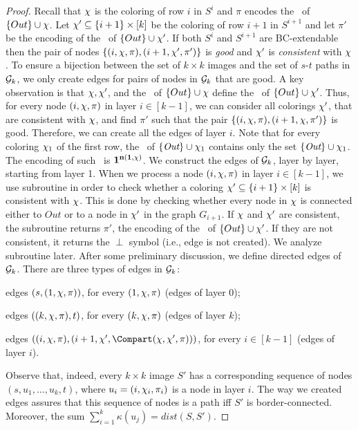 \documentclass[11pt,english]{article}
\renewenvironment{itemize}[1]{\begin{compactitem}#1}{\end{compactitem}}
\numberwithin{figure}{section}
\newcommand{\dis}{dist}
\begin{document}
\begin{proof}
Recall that $\chi$ is the coloring of row $i$ in $S^i$ and $\pi$ encodes the \cc\ of $\{Out\}\cup\chi$. Let $\chi'\subseteq\{i+1\}\times[k]$ be the coloring of row $i+1$ in $S^{i+1}$ and let $\pi'$ be the encoding of the \cc\ of $\{Out\}\cup\chi'$. If both $S^i$ and $S^{i+1}$ are BC-extendable then the pair of nodes $\{(i,\chi,\pi),(i+1,\chi',\pi')\}$ is {\em good} and $\chi'$ is {\em consistent} with $\chi$. To ensure a bijection between the set of $k\times k$ images and the set of $s$-$t$ paths in ${\mathcal G}_k$, we only create edges for pairs of nodes in ${\mathcal G}_k$ that are good. A key observation is that $\chi,\chi'$, and the \cc\ of $\{Out\}\cup\chi$ define the \cc\ of $\{Out\}\cup\chi'$. Thus, for every node $(i,\chi,\pi)$ in layer $i\in[k-1]$, we can consider all colorings $\chi'$, that are consistent with $\chi$, and find $\pi'$ such that the pair $\{(i,\chi,\pi),(i+1,\chi,\pi')\}$ is good. Therefore, we can create all the edges of layer $i$. Note that for every coloring $\chi_1$ of the first row, the \cc\ of $\{\mbox{\it Out}\}\cup\chi_1$ contains only the set $\{\mbox{\it Out}\}\cup\chi_1$. The encoding of such \cc\ is $\bf 1^{n(1,\chi)}$. We construct the edges of ${\mathcal G}_k$, layer by layer, starting from layer 1. When we process a node $(i,\chi,\pi)$ in layer $i\in[k-1]$, we use subroutine \Compart in order to check whether a coloring $\chi'\subseteq\{i+1\}\times[k]$ is consistent with $\chi$. This is done by checking whether every node in $\chi$ is connected either to $Out$ or to a node in $\chi'$ in the graph $G_{i+1}$. If $\chi$ and $\chi'$ are consistent, the subroutine returns $\pi'$, the encoding of the \cc\ of $\{Out\}\cup\chi'$. If they are not consistent, it returns the $\perp$ symbol (i.e., edge is not created). We analyze subroutine \Compart later. After some preliminary discussion, we define directed edges of ${\mathcal G}_k$. There are three types of edges in ${\mathcal G}_k$:
\begin{itemize}
\item
edges $(s,(1,\chi,\pi))$, for every $(1,\chi,\pi)$ (edges of layer 0);
\item
edges $((k,\chi,\pi),t)$, for every $(k,\chi,\pi)$ (edges of layer $k$);
\item
edges $((i,\col,\pi),(i+1,\col', \Compart(\col,\col',\pi)))$, for every $i\in[k-1]$ (edges of layer $i$).
\end{itemize}

Observe that, indeed, every $k\times k$ image $S'$ has a corresponding sequence of nodes $(s,u_1,\ldots,u_k,t)$, where $u_i=(i,\chi_i,\pi_i)$ is a node in layer $i$. The way we created edges assures that this sequence of nodes is a path iff $S'$ is border-connected. Moreover, the sum $\sum_{i=1}^k\kappa(u_j)=\dis(S,{S'})$.


\end{proof}
\end{document}

